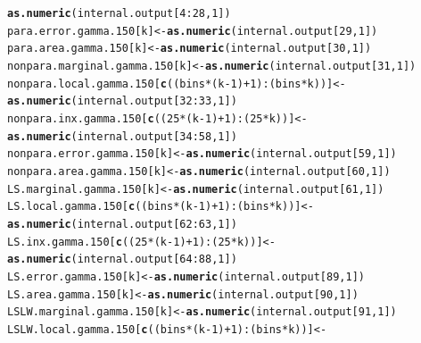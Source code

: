 \documentclass[11pt]{article}\usepackage[]{graphicx}\usepackage[]{color}
\makeatletter
\newcommand{\hlnum}[1]{\textcolor[rgb]{0.686,0.059,0.569}{#1}}%
\newcommand{\hlopt}[1]{\textcolor[rgb]{0,0,0}{#1}}%
\newcommand{\hlstd}[1]{\textcolor[rgb]{0.345,0.345,0.345}{#1}}%
\newcommand{\hlkwb}[1]{\textcolor[rgb]{0.69,0.353,0.396}{#1}}%
\newcommand{\hlkwd}[1]{\textcolor[rgb]{0.737,0.353,0.396}{\textbf{#1}}}%
\newenvironment{kframe}{%
 \def\at@end@of@kframe{}%
 \ifinner\ifhmode%
  \def\at@end@of@kframe{\end{minipage}}%
  \begin{minipage}{\columnwidth}%
 \fi\fi%
 \def\FrameCommand##1{\hskip\@totalleftmargin \hskip-\fboxsep
 \colorbox{shadecolor}{##1}\hskip-\fboxsep
     \hskip-\linewidth \hskip-\@totalleftmargin \hskip\columnwidth}%
 \MakeFramed {\advance\hsize-\width
   \@totalleftmargin\z@ \linewidth\hsize
   \@setminipage}}%
 {\par\unskip\endMakeFramed%
 \at@end@of@kframe}
\newenvironment{knitrout}{}{} %
\makeatother
\begin{document}
\begin{knitrout}
\begin{kframe}
\begin{alltt}
    \hlkwd{as.numeric}\hlstd{(internal.output[}\hlnum{4}\hlopt{:}\hlnum{28}\hlstd{,} \hlnum{1}\hlstd{])}
  \hlstd{para.error.gamma.150[k]} \hlkwb{<-} \hlkwd{as.numeric}\hlstd{(internal.output[}\hlnum{29}\hlstd{,} \hlnum{1}\hlstd{])}
  \hlstd{para.area.gamma.150[k]} \hlkwb{<-} \hlkwd{as.numeric}\hlstd{(internal.output[}\hlnum{30}\hlstd{,} \hlnum{1}\hlstd{])}
  \hlstd{nonpara.marginal.gamma.150[k]} \hlkwb{<-} \hlkwd{as.numeric}\hlstd{(internal.output[}\hlnum{31}\hlstd{,} \hlnum{1}\hlstd{])}
  \hlstd{nonpara.local.gamma.150[}\hlkwd{c}\hlstd{((bins}\hlopt{*}\hlstd{(k}\hlopt{-}\hlnum{1}\hlstd{)}\hlopt{+}\hlnum{1}\hlstd{)}\hlopt{:}\hlstd{(bins}\hlopt{*}\hlstd{k))]} \hlkwb{<-}
    \hlkwd{as.numeric}\hlstd{(internal.output[}\hlnum{32}\hlopt{:}\hlnum{33}\hlstd{,} \hlnum{1}\hlstd{])}
  \hlstd{nonpara.inx.gamma.150[}\hlkwd{c}\hlstd{((}\hlnum{25}\hlopt{*}\hlstd{(k}\hlopt{-}\hlnum{1}\hlstd{)}\hlopt{+}\hlnum{1}\hlstd{)}\hlopt{:}\hlstd{(}\hlnum{25}\hlopt{*}\hlstd{k))]} \hlkwb{<-}
    \hlkwd{as.numeric}\hlstd{(internal.output[}\hlnum{34}\hlopt{:}\hlnum{58}\hlstd{,} \hlnum{1}\hlstd{])}
  \hlstd{nonpara.error.gamma.150[k]} \hlkwb{<-} \hlkwd{as.numeric}\hlstd{(internal.output[}\hlnum{59}\hlstd{,} \hlnum{1}\hlstd{])}
  \hlstd{nonpara.area.gamma.150[k]} \hlkwb{<-} \hlkwd{as.numeric}\hlstd{(internal.output[}\hlnum{60}\hlstd{,} \hlnum{1}\hlstd{])}
  \hlstd{LS.marginal.gamma.150[k]} \hlkwb{<-} \hlkwd{as.numeric}\hlstd{(internal.output[}\hlnum{61}\hlstd{,} \hlnum{1}\hlstd{])}
  \hlstd{LS.local.gamma.150[}\hlkwd{c}\hlstd{((bins}\hlopt{*}\hlstd{(k}\hlopt{-}\hlnum{1}\hlstd{)}\hlopt{+}\hlnum{1}\hlstd{)}\hlopt{:}\hlstd{(bins}\hlopt{*}\hlstd{k))]} \hlkwb{<-}
    \hlkwd{as.numeric}\hlstd{(internal.output[}\hlnum{62}\hlopt{:}\hlnum{63}\hlstd{,} \hlnum{1}\hlstd{])}
  \hlstd{LS.inx.gamma.150[}\hlkwd{c}\hlstd{((}\hlnum{25}\hlopt{*}\hlstd{(k}\hlopt{-}\hlnum{1}\hlstd{)}\hlopt{+}\hlnum{1}\hlstd{)}\hlopt{:}\hlstd{(}\hlnum{25}\hlopt{*}\hlstd{k))]} \hlkwb{<-}
    \hlkwd{as.numeric}\hlstd{(internal.output[}\hlnum{64}\hlopt{:}\hlnum{88}\hlstd{,} \hlnum{1}\hlstd{])}
  \hlstd{LS.error.gamma.150[k]} \hlkwb{<-} \hlkwd{as.numeric}\hlstd{(internal.output[}\hlnum{89}\hlstd{,} \hlnum{1}\hlstd{])}
  \hlstd{LS.area.gamma.150[k]} \hlkwb{<-} \hlkwd{as.numeric}\hlstd{(internal.output[}\hlnum{90}\hlstd{,} \hlnum{1}\hlstd{])}
  \hlstd{LSLW.marginal.gamma.150[k]} \hlkwb{<-} \hlkwd{as.numeric}\hlstd{(internal.output[}\hlnum{91}\hlstd{,} \hlnum{1}\hlstd{])}
  \hlstd{LSLW.local.gamma.150[}\hlkwd{c}\hlstd{((bins}\hlopt{*}\hlstd{(k}\hlopt{-}\hlnum{1}\hlstd{)}\hlopt{+}\hlnum{1}\hlstd{)}\hlopt{:}\hlstd{(bins}\hlopt{*}\hlstd{k))]} \hlkwb{<-}

\end{alltt}
\end{kframe}
\end{knitrout}
\end{document}
